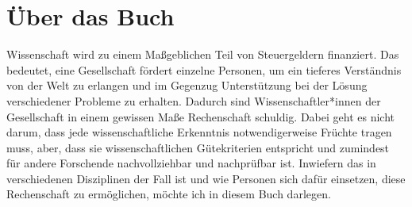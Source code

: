 \documentclass[
  letterpaper,
  DIV=11,
  numbers=noendperiod]{scrreprt}
\begin{document}


\chapter{Über das Buch}\label{uxfcber-das-buch}

Wissenschaft wird zu einem Maßgeblichen Teil von Steuergeldern
finanziert. Das bedeutet, eine Gesellschaft fördert einzelne Personen,
um ein tieferes Verständnis von der Welt zu erlangen und im Gegenzug
Unterstützung bei der Lösung verschiedener Probleme zu erhalten. Dadurch
sind Wissenschaftler*innen der Gesellschaft in einem gewissen Maße
Rechenschaft schuldig. Dabei geht es nicht darum, dass jede
wissenschaftliche Erkenntnis notwendigerweise Früchte tragen muss, aber,
dass sie wissenschaftlichen Gütekriterien entspricht und zumindest für
andere Forschende nachvollziehbar und nachprüfbar ist. Inwiefern das in
verschiedenen Disziplinen der Fall ist und wie Personen sich dafür
einsetzen, diese Rechenschaft zu ermöglichen, möchte ich in diesem Buch
darlegen.
\end{document}
